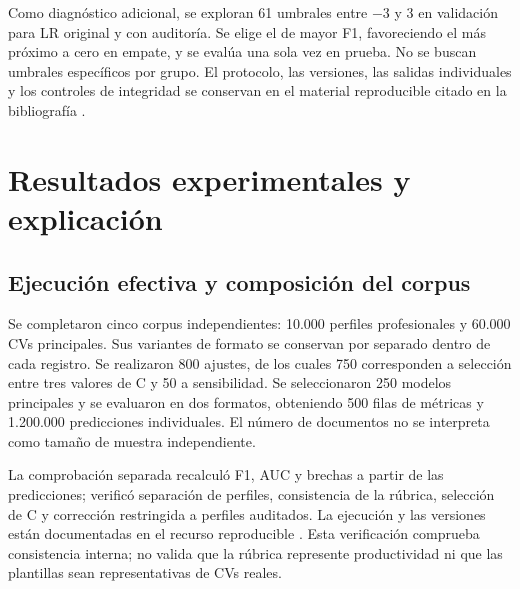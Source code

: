 \documentclass[11pt,a4paper,oneside]{report}
\begin{document}
Como diagnóstico adicional, se exploran 61 umbrales entre $-3$ y $3$ en validación para LR original y con auditoría. Se elige el de mayor F1, favoreciendo el más próximo a cero en empate, y se evalúa una sola vez en prueba. No se buscan umbrales específicos por grupo. El protocolo, las versiones, las salidas individuales y los controles de integridad se conservan en el material reproducible citado en la bibliografía \cite{repositorio2026}.
\chapter{Resultados experimentales y explicación}
\label{cap:resultados}
\section{Ejecución efectiva y composición del corpus}
Se completaron cinco corpus independientes: 10.000 perfiles profesionales y 60.000 CVs principales. Sus variantes de formato se conservan por separado dentro de cada registro. Se realizaron 800 ajustes, de los cuales 750 corresponden a selección entre tres valores de C y 50 a sensibilidad. Se seleccionaron 250 modelos principales y se evaluaron en dos formatos, obteniendo 500 filas de métricas y 1.200.000 predicciones individuales. El número de documentos no se interpreta como tamaño de muestra independiente.

La comprobación separada recalculó F1, AUC y brechas a partir de las predicciones; verificó separación de perfiles, consistencia de la rúbrica, selección de C y corrección restringida a perfiles auditados. La ejecución y las versiones están documentadas en el recurso reproducible \cite{repositorio2026}. Esta verificación comprueba consistencia interna; no valida que la rúbrica represente productividad ni que las plantillas sean representativas de CVs reales.
\end{document}
